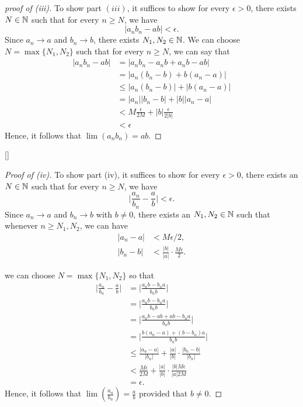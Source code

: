\begin{proof}[proof of (iii)]
    To show part \( (iii)\), it suffices to show for every \( \epsilon  > 0 \), there exists \( N \in \mathbb{N} \) such that for every \( n \geq N \), we have 
    \[ | a_nb_n - ab | < \epsilon.\]
Since \( a_n \to a \) and \( b_n \to b\), there exists \( N_1 , N_2 \in \mathbb{N} \). We can choose \( N = \max \{ N_1, N_2  \}\) such that for every \( n \geq N \), we can say that 
\begin{align*}
 | a_nb_n - ab |&= | a_nb_n -a_nb + a_nb - ab |  \\
                &= | a_n (b_n - b ) + b (a_n - a)| \\ 
                &\leq | a_n (b_n - b) |  + | b (a_n - a) | \\ 
                &= | a_n | | b_n - b  |  + | b | | a_n - a |  \\
                &< M \frac{ \epsilon }{2 M }  + | b | \frac{ \epsilon }{2 | b |} \tag{ \( a_n \) is bounded } \\ 
                &< \epsilon  
\end{align*}
Hence, it follows that \( \lim (a_nb_n) = ab\).
\end{proof}[]%

\begin{proof}[Proof of (iv)]
To show part (iv), it suffices to show for every \( \epsilon  > 0 \), there exists an \( N \in \mathbb{N}\) such that for every \( n \geq N \), we have 
\[ \Big| \frac{a_n}{b_n} - \frac{a}{b} \Big| < \epsilon.\]
Since \( a_n \to a \) and \( b_n \to b\) with \( b \neq 0 \), there exists an \( N_1, N_2 \in \mathbb{N}   \) such that whenever \( n \geq N_1, N_2\), we can have
\begin{align*}
 | a_n - a  |&<  M \epsilon / 2,  \\
 | b_n - b | &<  \frac{ | b |}{ | a |} \cdot \frac{ M \epsilon }{2}.
\end{align*}



we can choose \( N = \max \{ N_1, N_2 \}\) so that 
\begin{align*}
   \Big| \frac{a_n}{b_n} - \frac{a}{b} \Big| &=  \Big| \frac{a_nb - b_n a}{b_nb} \Big|   \\
                                     &=  \Big| \frac{a_nb - b_n a}{b_nb} \Big| \\
                                     &= \Big| \frac{a_nb - ab + ab- b_n a}{b_nb} \Big| \\
                                     &=  \Big| \frac{b(a_n - a) + (b- b_n)a}{b_nb} \Big| \\
                                     &\leq  \frac{|a_n - a|}{|b_n|} + \frac{ | a |}{ | b |} \cdot \frac{|b_n - b|}{|b_n|} \\
                                     &< \frac{ M \epsilon }{ 2M} + \frac{ | a |}{ | b |} \cdot \frac{ | b | M  \epsilon}{  | a | 2 M} \tag{ \( b_n\) bounded} \\
                                     &= \epsilon. 
\end{align*}
Hence, it follows that \( \lim ( \frac{a_n}{b_n} ) = \frac{a}{b} \) provided that \( b \neq 0\).



\end{proof}%

